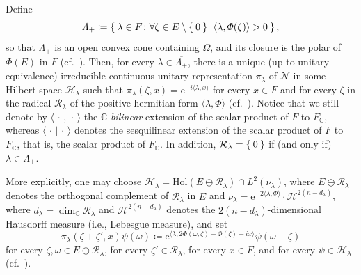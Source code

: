 \documentclass[10.5pt,reqno]{amsart}
\newcommand{\Hol}{\mathrm{Hol}}
\newcommand{\ee}{\mathrm{e}}
\newcommand{\C}{\mathds{C}}
\newcommand{\Hs}{\mathscr{H}}
\newcommand{\Hc}{\mathcal{H}}
\newcommand{\Nc}{\mathcal{N}}
\newcommand{\Rc}{\mathcal{R}}
\begin{document}
Define 
\[
\Lambda_+\coloneqq \Set{\lambda\in F\colon \forall \zeta\in E\setminus \Set{0}\:\: \langle \lambda, \Phi(\zeta)\rangle>0},
\]
so that $\Lambda_+$ is an open convex cone containing $\Omega$, and its closure is the polar of $\Phi(E)$ in $F$ (cf.~\cite[Proposition 2.5]{PWS}). 
Then, for every $\lambda\in \overline{\Lambda_+}$, there is a unique (up to unitary equivalence) irreducible continuous unitary representation $\pi_\lambda$ of $\Nc$ in some Hilbert space $\Hs_\lambda$  such that $\pi_\lambda(\zeta, x)=\ee^{-i \langle \lambda,x \rangle}$ for every $x\in F$ and for every $\zeta$ in the radical $\Rc_\lambda$ of the positive hermitian form $\langle \lambda, \Phi\rangle$ (cf.~\cite[Subsection 2.3]{PWS}). Notice that we still denote by $\langle\,\cdot\,,\,\cdot\,\rangle$   the $\C$-\emph{bilinear} extension of the scalar product of $F$ to $F_\C$, whereas $\langle \,\cdot\,\vert \,\cdot\,\rangle$ denotes the sesquilinear extension of the scalar product of $F$ to $F_\C$, that is, the scalar product of $F_\C$. In addition, $\Rc_\lambda=\Set{0}$ if (and only if) $\lambda\in \Lambda_+$. 

More explicitly, one may choose $\Hs_\lambda=\Hol(E\ominus\Rc_\lambda)\cap L^2(\nu_\lambda)$, where $E\ominus \Rc_\lambda$ denotes the orthogonal complement of $\Rc_\lambda$ in $E$ and $\nu_\lambda=\ee^{-2\langle \lambda, \Phi\rangle}\cdot \Hc^{2(n-d_\lambda)}$, where $d_\lambda=\dim_\C \Rc_\lambda$ and $\Hc^{2(n-d_\lambda)}$ denotes the $2(n-d_\lambda)$-dimensional Hausdorff measure (i.e., Lebesgue measure), and set
\[
\pi_\lambda(\zeta+\zeta',x) \psi(\omega)\coloneqq \ee^{\langle \lambda, 2 \Phi(\omega,\zeta)  -\Phi(\zeta) -i x \rangle} \psi(\omega-\zeta)
\]
for every $\zeta,\omega\in E\ominus \Rc_\lambda$, for every $\zeta'\in \Rc_\lambda$, for every $x\in F$, and for every $\psi\in \Hs_\lambda$ (cf.~\cite[Subsection 2.3]{PWS}). 
\end{document}
